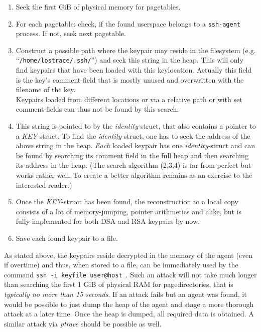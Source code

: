\begin{enumerate}

	\item Seek the first GiB of physical memory for pagetables.

	\item For each pagetable: check, if the found userspace belongs to a
	\texttt{ssh-agent} process. If not, seek next pagetable.

	\item Construct a possible path where the keypair may reside in the
	filesystem (e.g. ``\texttt{/home/lostrace/.ssh/}'') and seek this string
	in the heap. This will only find keypairs that have been loaded with
	this keylocation. Actually this field is the key's comment-field that is
	mostly unused and overwritten with the filename of the key. \\ Keypairs
	loaded from different locations or via a relative path or with set
	comment-fields can thus not be found by this search.
	
	\item This string is pointed to by the \emph{identity}-struct, that also
	contains a pointer to a \emph{KEY}-struct. To find the
	\emph{identity}-struct, one has to seek the address of the above string
	in the heap. \emph{Each} loaded keypair has one \emph{identity}-struct
	and can be found by searching its comment field in the full heap and
	then searching its address in the heap. (The search algorithm (2,3,4) is
	far from perfect but works rather well. To create a better algorithm
	remains as an exercise to the interested reader.)
	
	\item Once the \emph{KEY}-struct has been found, the reconstruction to a
	local copy consists of a lot of memory-jumping, pointer arithmetics and
	alike, but is fully implemented for both DSA and RSA keypairs by now.

	\item Save each found keypair to a file.
	
\end{enumerate}

As stated above, the keypairs reside decrypted in the memory of the agent (even
if overtime) and thus, when stored to a file, can be immediately used by the
command \texttt{ssh~-i~keyfile~user@host}~.  Such an attack will not take much
longer than searching the first 1 GiB of physical RAM for pagedirectories, that
is \emph{typically no more than 15 seconds}. If an attack fails but an agent was
found, it would be possible to just dump the heap of the agent and stage a more
thorough attack at a later time. Once the heap is dumped, all required data is
obtained. A similar attack via \emph{ptrace} should be possible as well.

